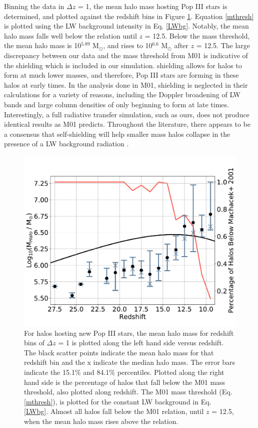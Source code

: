 \documentclass[a4paper,fleqn,usenatbib]{mnras}
\begin{document}
Binning the data in $\Delta z$ = 1, the mean halo mass hosting Pop III stars is determined, and plotted against the redshift bins in Figure \ref{fig:mean_mass}. Equation \ref{mthresh} is plotted using the LW background intensity in Eq. \ref{LWbg}. Notably, the mean halo mass falls well below the relation until $z$ = 12.5. Below the mass threshold, the mean halo mass is 10$^{5.89}$ M$_{\odot}$, and rises to 10$^{6.6}$ M$_{\odot}$ after $z$ = 12.5. The large discrepancy between our data and the mass threshold from M01 is indicative of the \hh{} shielding which is included in our simulation. \hh{} shielding allows for halos to form at much lower masses, and therefore, Pop III stars are forming in these halos at early times. In the analysis done in M01, \hh{} shielding is neglected in their calculations for a variety of reasons, including the Doppler broadening of LW bands and large column densities of \hh{} only beginning to form at late times. Interestingly, a full radiative transfer simulation, such as ours, does not produce identical results as M01 predicts. Throughout the literature, there appears to be a consensus that \hh{} self-shielding will help smaller mass halos collapse in the presence of a LW background radiation \citep[E.g.]{Yoshida03, Ricotti01, Glover01, Hartwig15}.

\begin{figure}
	\includegraphics[width=\columnwidth]{images/mean_mass_errorb_fix.pdf}
    \caption{For halos hosting new Pop III stars, the mean halo mass for redshift bins of $\Delta z$ = 1 is plotted along the left hand side versus redshift. The black scatter points indicate the mean halo mass for that redshift bin and the x indicate the median halo mass. The error bars indicate the 15.1\% and 84.1\% percentiles. Plotted along the right hand side is the percentage of halos that fall below the M01 mass threshold, also plotted along redshift. The M01 mass threshold (Eq. \ref{mthresh}), is plotted for the constant LW background in Eq. \ref{LWbg}. Almost all halos fall below the M01 relation, until $z$ = 12.5, when the mean halo mass rises above the relation.}
    \label{fig:mean_mass}
\end{figure}
\end{document}
